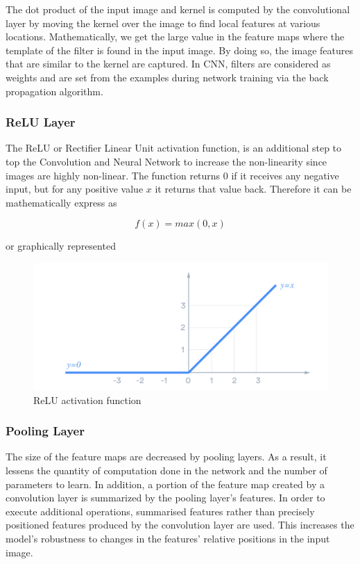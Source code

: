 \documentclass[conference]{IEEEtran}
\begin{document}
The dot product of the input image and kernel is computed by the convolutional layer by moving the kernel over the image to find local features at various locations. Mathematically, we get the large value in the feature maps where the template of the filter is found in the input image. By doing so, the image features that are similar to the kernel are captured. In CNN, filters are considered as weights and are set from the examples during network training via the back propagation algorithm.

\subsubsection{ReLU Layer}

The ReLU or Rectifier Linear Unit activation function, is an additional step to top the Convolution and Neural Network to increase the non-linearity since images are highly non-linear. The function returns 0 if it receives any negative input, but for any positive value  \( x \)  it returns that value back. Therefore it can be mathematically express as

\[ f(x) = max(0,x) \]

or graphically represented 

\begin{figure}[h!]
\centering
\includegraphics[width=1\linewidth]{images/relu.jpg}
\caption{ReLU activation function}
\label{fig:relu}
\end{figure}

\subsubsection{Pooling Layer}

The size of the feature maps are decreased by pooling layers. As a result, it lessens the quantity of computation done in the network and the number of parameters to learn. In addition, a portion of the feature map created by a convolution layer is summarized by the pooling layer's features. In order to execute additional operations, summarised features rather than precisely positioned features produced by the convolution layer are used. This increases the model's robustness to changes in the features' relative positions in the input image.
\end{document}
